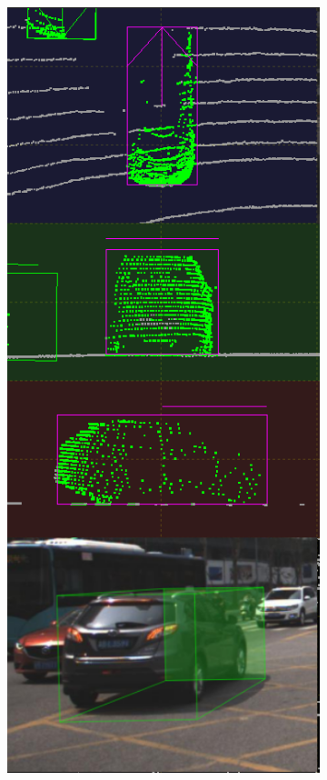 \documentclass[letterpaper, 10 pt, conference]{ieeeconf}  %
\begin{document}
\begin{figure}[th]
\begin{subfigure}{0.16\linewidth}
		\includegraphics[scale=0.12]{./figures/transfer/car-2}
		\caption{}
	\end{subfigure}
	~
	\begin{subfigure}{0.16\linewidth}

\end{subfigure}
\end{figure}
\end{document}
